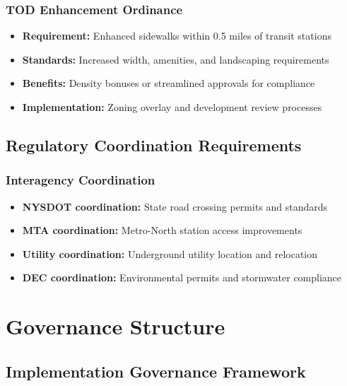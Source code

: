 \documentclass[11pt,letterpaper]{article}
\begin{document}
\subsubsection{TOD Enhancement Ordinance}
\begin{itemize}
    \item \textbf{Requirement:} Enhanced sidewalks within 0.5 miles of transit stations
    \item \textbf{Standards:} Increased width, amenities, and landscaping requirements
    \item \textbf{Benefits:} Density bonuses or streamlined approvals for compliance
    \item \textbf{Implementation:} Zoning overlay and development review processes
\end{itemize}

\subsection{Regulatory Coordination Requirements}

\subsubsection{Interagency Coordination}
\begin{itemize}
    \item \textbf{NYSDOT coordination:} State road crossing permits and standards
    \item \textbf{MTA coordination:} Metro-North station access improvements
    \item \textbf{Utility coordination:} Underground utility location and relocation
    \item \textbf{DEC coordination:} Environmental permits and stormwater compliance
\end{itemize}

\section{Governance Structure}

\subsection{Implementation Governance Framework}
\end{document}
